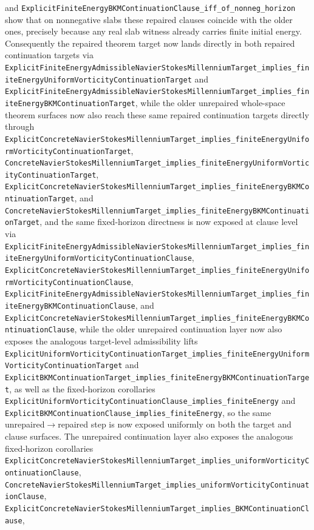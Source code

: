 \documentclass[11pt]{article}
\begin{document}
and \texttt{ExplicitFiniteEnergyBKMContinuationClause\_iff\_of\_nonneg\_horizon}
show that on nonnegative slabs these repaired clauses coincide with the older
ones, precisely because any real slab witness already carries finite initial
energy.  Consequently the repaired theorem target now lands directly in both
repaired continuation targets via
\texttt{ExplicitFiniteEnergyAdmissibleNavierStokesMillenniumTarget\_implies\_finiteEnergyUniformVorticityContinuationTarget}
and
\texttt{ExplicitFiniteEnergyAdmissibleNavierStokesMillenniumTarget\_implies\_finiteEnergyBKMContinuationTarget},
while the older unrepaired whole-space theorem surfaces now also reach these
same repaired continuation targets directly through
\texttt{ExplicitConcreteNavierStokesMillenniumTarget\_implies\_finiteEnergyUniformVorticityContinuationTarget},
\texttt{ConcreteNavierStokesMillenniumTarget\_implies\_finiteEnergyUniformVorticityContinuationTarget},
\texttt{ExplicitConcreteNavierStokesMillenniumTarget\_implies\_finiteEnergyBKMContinuationTarget},
and
\texttt{ConcreteNavierStokesMillenniumTarget\_implies\_finiteEnergyBKMContinuationTarget},
and the same fixed-horizon directness is now exposed at clause level via
\texttt{ExplicitFiniteEnergyAdmissibleNavierStokesMillenniumTarget\_implies\_finiteEnergyUniformVorticityContinuationClause},
\texttt{ExplicitConcreteNavierStokesMillenniumTarget\_implies\_finiteEnergyUniformVorticityContinuationClause},
\texttt{ExplicitFiniteEnergyAdmissibleNavierStokesMillenniumTarget\_implies\_finiteEnergyBKMContinuationClause},
and
\texttt{ExplicitConcreteNavierStokesMillenniumTarget\_implies\_finiteEnergyBKMContinuationClause},
while the older unrepaired continuation layer now also exposes the analogous
target-level admissibility lifts
\texttt{ExplicitUniformVorticityContinuationTarget\_implies\_finiteEnergyUniformVorticityContinuationTarget}
and
\texttt{ExplicitBKMContinuationTarget\_implies\_finiteEnergyBKMContinuationTarget},
as well as the fixed-horizon corollaries
\texttt{ExplicitUniformVorticityContinuationClause\_implies\_finiteEnergy}
and
\texttt{ExplicitBKMContinuationClause\_implies\_finiteEnergy},
so the same unrepaired$\to$repaired step is now exposed uniformly on both the
target and clause surfaces.  The unrepaired continuation layer also exposes the
analogous
fixed-horizon corollaries
\texttt{ExplicitConcreteNavierStokesMillenniumTarget\_implies\_uniformVorticityContinuationClause},
\texttt{ConcreteNavierStokesMillenniumTarget\_implies\_uniformVorticityContinuationClause},
\texttt{ExplicitConcreteNavierStokesMillenniumTarget\_implies\_BKMContinuationClause},
\end{document}
